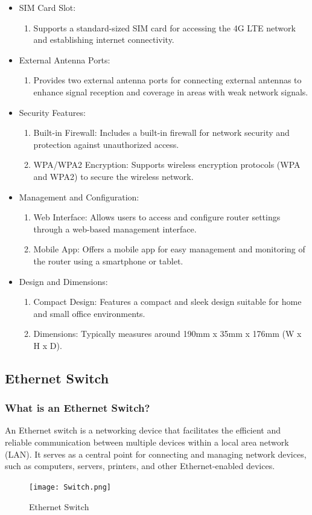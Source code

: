 \documentclass[
12pt,
oneside, 
onehalfspacing, 
nolistspacing, 
parskip, 
chapterinoneline, 
]{AASTCOMPUTER}
\begin{document}
\begin{itemize}
\begin{enumerate}
    \end{enumerate}
    \item SIM Card Slot:
    \begin{enumerate}
        \item Supports a standard-sized SIM card for accessing the 4G LTE network and establishing internet connectivity.
    \end{enumerate}
    \item External Antenna Ports:
    \begin{enumerate}
        \item Provides two external antenna ports for connecting external antennas to enhance signal reception and coverage in areas with weak network signals.
    \end{enumerate}
    \item Security Features:
    \begin{enumerate}
        \item Built-in Firewall: Includes a built-in firewall for network security and protection against unauthorized access.
        \item WPA/WPA2 Encryption: Supports wireless encryption protocols (WPA and WPA2) to secure the wireless network.
    \end{enumerate}
    \item Management and Configuration:
    \begin{enumerate}
        \item Web Interface: Allows users to access and configure router settings through a web-based management interface.
        \item Mobile App: Offers a mobile app for easy management and monitoring of the router using a smartphone or tablet.
    \end{enumerate}
    \item Design and Dimensions:
    \begin{enumerate}
        \item Compact Design: Features a compact and sleek design suitable for home and small office environments.
        \item Dimensions: Typically measures around 190mm x 35mm x 176mm (W x H x D).
    \end{enumerate}
\end{itemize}
\subsection{Ethernet Switch}
\subsubsection{What is an Ethernet Switch?}
An Ethernet switch is a networking device that facilitates the efficient and reliable communication between multiple devices within a local area network (LAN). It serves as a central point for connecting and managing network devices, such as computers, servers, printers, and other Ethernet-enabled devices.
\begin{figure}[!ht]
\centering
\texttt{[image: Switch.png]}
\caption[Switch]{Ethernet Switch}
\label{fig:TCU}
\end{figure}
\end{document}

